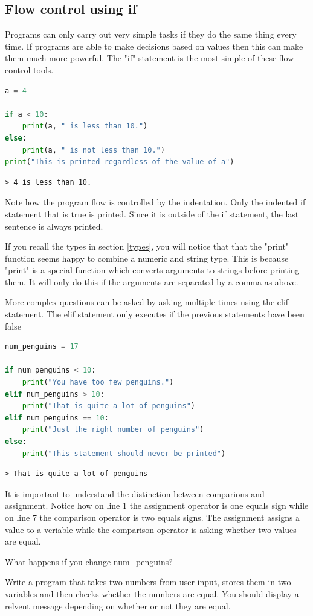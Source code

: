	\subsection{Flow control using if}
		Programs can only carry out very simple tasks if they do the same thing every time. If programs are able to make decisions based on values then this can make them much more powerful. The "if" statement is the most simple of these flow control tools.
		
		\begin{lstlisting}[language=Python]
a = 4

if a < 10:
	print(a, " is less than 10.")
else:
	print(a, " is not less than 10.")
print("This is printed regardless of the value of a")\end{lstlisting}
		\begin{verbatim}> 4 is less than 10.\end{verbatim}	
		Note how the program flow is controlled by the indentation. Only the indented if statement that is true is printed. Since it is outside of the if statement, the last sentence is always printed.
		
		If you recall the types in section \ref{types}, you will notice that that the "print" function seems happy to combine a numeric and string type. This is because "print" is a special function which converts arguments to strings before printing them. It will only do this if the arguments are separated by a comma as above.
		
		More complex questions can be asked by asking multiple times using the elif statement. The elif statement only executes if the previous statements have been false
		\begin{lstlisting}[language=Python]
num_penguins = 17

if num_penguins < 10:
	print("You have too few penguins.")
elif num_penguins > 10:
	print("That is quite a lot of penguins")
elif num_penguins == 10:
	print("Just the right number of penguins")
else:
	print("This statement should never be printed")\end{lstlisting}
		\begin{verbatim}> That is quite a lot of penguins\end{verbatim}
		It is important to understand the distinction between comparions and assignment. Notice how on line 1 the assignment operator is one equals sign while on line 7 the comparison operator is two equals signs. The assignment assigns a value to a veriable while the comparison operator is asking whether two values are equal.
		\begin{task}What happens if you change num\_penguins?\end{task}
		\begin{task}Write a program that takes two numbers from user input, stores them in two variables and then checks whether the numbers are equal. You should display a relvent message depending on whether or not they are equal.\end{task}


